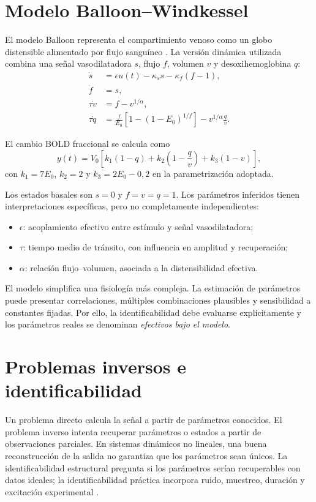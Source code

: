 \section{Modelo Balloon--Windkessel}
El modelo Balloon representa el compartimiento venoso como un globo distensible alimentado por flujo sanguíneo \citep{Buxton1998}. La versión dinámica utilizada combina una señal vasodilatadora $s$, flujo $f$, volumen $v$ y desoxihemoglobina $q$:
\begin{align}
\dot s &= \epsilon u(t)-\kappa_s s-\kappa_f(f-1), \\
\dot f &= s, \\
\tau\dot v &= f-v^{1/\alpha}, \\
\tau\dot q &= \frac{f}{E_0}\left[1-(1-E_0)^{1/f}\right]-v^{1/\alpha}\frac{q}{v}.
\label{eq:balloon}
\end{align}

El cambio BOLD fraccional se calcula como
\begin{equation}
 y(t)=V_0\left[k_1(1-q)+k_2\left(1-\frac{q}{v}\right)+k_3(1-v)\right],
 \label{eq:bold}
\end{equation}
con $k_1=7E_0$, $k_2=2$ y $k_3=2E_0-0{,}2$ en la parametrización adoptada.

Los estados basales son $s=0$ y $f=v=q=1$. Los parámetros inferidos tienen interpretaciones específicas, pero no completamente independientes:
\begin{itemize}
  \item $\epsilon$: acoplamiento efectivo entre estímulo y señal vasodilatadora;
  \item $\tau$: tiempo medio de tránsito, con influencia en amplitud y recuperación;
  \item $\alpha$: relación flujo--volumen, asociada a la distensibilidad efectiva.
\end{itemize}

El modelo simplifica una fisiología más compleja. La estimación de parámetros puede presentar correlaciones, múltiples combinaciones plausibles y sensibilidad a constantes fijadas. Por ello, la identificabilidad debe evaluarse explícitamente y los parámetros reales se denominan \emph{efectivos bajo el modelo}.

\section{Problemas inversos e identificabilidad}
Un problema directo calcula la señal a partir de parámetros conocidos. El problema inverso intenta recuperar parámetros o estados a partir de observaciones parciales. En sistemas dinámicos no lineales, una buena reconstrucción de la salida no garantiza que los parámetros sean únicos. La identificabilidad estructural pregunta si los parámetros serían recuperables con datos ideales; la identificabilidad práctica incorpora ruido, muestreo, duración y excitación experimental \citep{Miao2011,Chis2023}.

